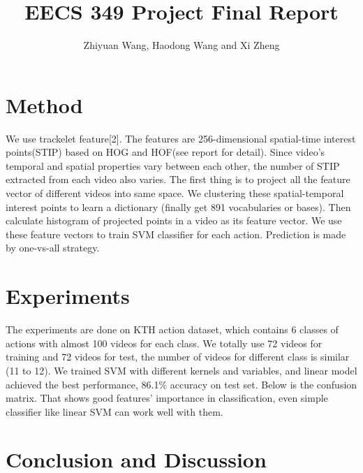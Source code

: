 \documentclass{article}
\begin{document}
\title{EECS 349 Project Final Report}
\author{Zhiyuan Wang, Haodong Wang and Xi Zheng}
\maketitle
\section{Method}
We use trackelet feature[2]. The features are 256-dimensional spatial-time interest points(STIP) based on HOG and HOF(see report for detail). Since video's temporal and spatial properties vary between each other, the number of STIP extracted from each video also varies. The first thing is to project all the feature vector of different videos into same space. We clustering these spatial-temporal interest points to learn a dictionary (finally get 891 vocabularies or bases). Then calculate histogram of projected points in a video as its feature vector. We use these feature vectors to train SVM classifier for each action. Prediction is made by one-vs-all strategy. 
\section{Experiments}
The experiments are done on KTH action dataset, which contains 6 classes of actions with almost 100 videos for each class. We totally use 72 videos for training and 72 videos for test, the number of videos for different class is similar (11 to 12). We trained SVM with different kernels and variables, and linear model achieved the best performance, 86.1\% accuracy on test set. Below is the confusion matrix. That shows good features' importance in classification, even simple classifier like linear SVM can work well with them. 

\section{Conclusion and Discussion}
\end{document}
